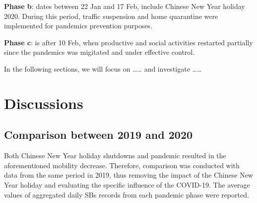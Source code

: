 \documentclass[preprints,ijgi,submit,moreauthors]{Definitions/mdpi}
\begin{document}
\textbf{Phase b}: dates between 22 Jan and 17 Feb, include Chinese New Year holiday 2020. During this period, traffic suspension and home quarantine were implemented for pandemics prevention purposes.

\textbf{Phase c}: is after 10 Feb, when productive and social activities restarted partially since the pandemics was migitated and under effective control.

In the following sections, we will focus on …… and investigate ……

\section{Discussions}
\subsection{Comparison between 2019 and 2020}%

Both Chinese New Year holiday shutdowns and pandemic resulted in the aforementioned mobility decrease.
Therefore, comparison was conducted with data from the same period in 2019, thus removing the impact of the Chinese New Year holiday and evaluating the specific influence of the COVID-19.  
The average values of aggregated daily SBs records from each pandemic phase were reported.
\end{document}
